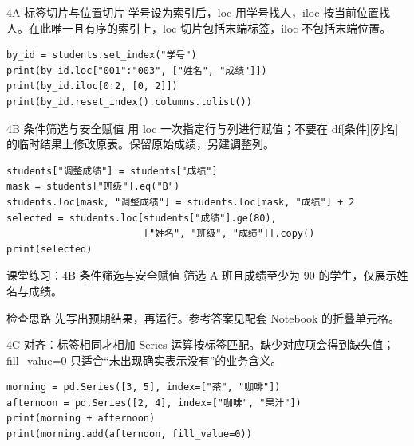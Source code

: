 \begin{frame}[fragile]{4A 标签切片与位置切片}
\small 学号设为索引后，loc 用学号找人，iloc 按当前位置找人。在此唯一且有序的索引上，loc 切片包括末端标签，iloc 不包括末端位置。
\medskip
\begin{lstlisting}
by_id = students.set_index("学号")
print(by_id.loc["001":"003", ["姓名", "成绩"]])
print(by_id.iloc[0:2, [0, 2]])
print(by_id.reset_index().columns.tolist())
\end{lstlisting}
\end{frame}

\begin{frame}[fragile]{4B 条件筛选与安全赋值}
\small 用 loc 一次指定行与列进行赋值；不要在 df[条件][列名] 的临时结果上修改原表。保留原始成绩，另建调整列。
\medskip
\begin{lstlisting}
students["调整成绩"] = students["成绩"]
mask = students["班级"].eq("B")
students.loc[mask, "调整成绩"] = students.loc[mask, "成绩"] + 2
selected = students.loc[students["成绩"].ge(80),
                        ["姓名", "班级", "成绩"]].copy()
print(selected)
\end{lstlisting}
\end{frame}
\begin{frame}[fragile]{课堂练习：4B 条件筛选与安全赋值}
筛选 A 班且成绩至少为 90 的学生，仅展示姓名与成绩。
\medskip
\begin{block}{检查思路}
先写出预期结果，再运行。参考答案见配套 Notebook 的折叠单元格。
\end{block}
\end{frame}

\begin{frame}[fragile]{4C 对齐：标签相同才相加}
\small Series 运算按标签匹配。缺少对应项会得到缺失值；fill\_value=0 只适合“未出现确实表示没有”的业务含义。
\medskip
\begin{lstlisting}
morning = pd.Series([3, 5], index=["茶", "咖啡"])
afternoon = pd.Series([2, 4], index=["咖啡", "果汁"])
print(morning + afternoon)
print(morning.add(afternoon, fill_value=0))
\end{lstlisting}
\end{frame}
